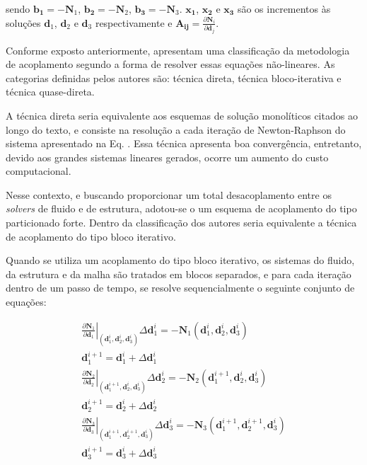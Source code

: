 \documentclass[tese_patricia]{subfiles}
\begin{document}
\noindent sendo $\mathbf{b_{1}} = - \mathbf{N}_{1}$, $\mathbf{b_{2}} = - \mathbf{N}_{2}$, $\mathbf{b_{3}} = - \mathbf{N}_{3}$. $\mathbf{x_{1}}$, $\mathbf{x_{2}}$ e $\mathbf{x_{3}}$ são os incrementos às soluções $\mathbf{d}_{1}$, $\mathbf{d}_{2}$ e $\mathbf{d}_{3}$ respectivamente e $\mathbf{A_{ij}} = \frac{\partial\mathbf{N}_{i}}{\partial\mathbf{d}_{j}}$. 

Conforme exposto anteriormente,  apresentam uma classificação da metodologia de acoplamento segundo a forma de resolver essas equações não-lineares. As categorias definidas pelos autores são: técnica direta, técnica bloco-iterativa e técnica quase-direta. 

A técnica direta seria equivalente aos esquemas de solução monolíticos citados ao longo do texto, e consiste na resolução a cada iteração de Newton-Raphson do sistema apresentado na Eq. . Essa técnica apresenta boa convergência, entretanto, devido aos grandes sistemas lineares gerados, ocorre um aumento do custo computacional.

Nesse contexto, e buscando proporcionar um total desacoplamento entre os \textit{solvers} de fluido e de estrutura, adotou-se o um esquema de acoplamento do tipo particionado forte. Dentro da classificação dos autores  seria equivalente a técnica de acoplamento do tipo bloco iterativo.

Quando se utiliza um acoplamento do tipo bloco iterativo, os sistemas do fluido, da estrutura e da malha são tratados em blocos separados, e para cada iteração dentro de um passo de tempo, se resolve sequencialmente o seguinte conjunto de equações:


\begin{align}
	\left .\frac{\partial\mathbf{N}_{1}}{\partial\mathbf{d}_{1}}\right|_{\left(\mathbf{d}_{1}^{i},\mathbf{d}_{2}^{i},\mathbf{d}_{3}^{i}\right)} \Delta\mathbf{d}_{1}^{i} = - \mathbf{N}_{1}\left(\mathbf{d}_{1}^{i},\mathbf{d}_{2}^{i},\mathbf{d}_{3}^{i}\right)  \label{eq:Fluido} \\
	\mathbf{d}_{1}^{i+1} =  \mathbf{d}_{1}^{i} + \Delta\mathbf{d}_{1}^{i} \label{eq:upFluido}	\\
	\left.\frac{\partial\mathbf{N}_{2}}{\partial\mathbf{d}_{2}}\right|_{\left(\mathbf{d}_{1}^{i+1},\mathbf{d}_{2}^{i},\mathbf{d}_{3}^{i}\right)} \Delta\mathbf{d}_{2}^{i} = - \mathbf{N}_{2}\left(\mathbf{d}_{1}^{i+1},\mathbf{d}_{2}^{i},\mathbf{d}_{3}^{i}\right) \label{eq:Estrutura}\\
	\mathbf{d}_{2}^{i+1} =  \mathbf{d}_{2}^{i} + \Delta\mathbf{d}_{2}^{i} \label{eq:upEstrutura}\\
	\left.\frac{\partial\mathbf{N}_{3}}{\partial\mathbf{d}_{3}}\right|_{\left(\mathbf{d}_{1}^{i+1},\mathbf{d}_{2}^{i+1},\mathbf{d}_{3}^{i}\right)} \Delta\mathbf{d}_{3}^{i} = - \mathbf{N}_{3}\left(\mathbf{d}_{1}^{i+1},\mathbf{d}_{2}^{i+1},\mathbf{d}_{3}^{i}\right) \label{eq:Malha}\\
	\mathbf{d}_{3}^{i+1} =  \mathbf{d}_{3}^{i} + \Delta\mathbf{d}_{3}^{i}  \label{eq:upMalha}
\end{align}
\end{document}
